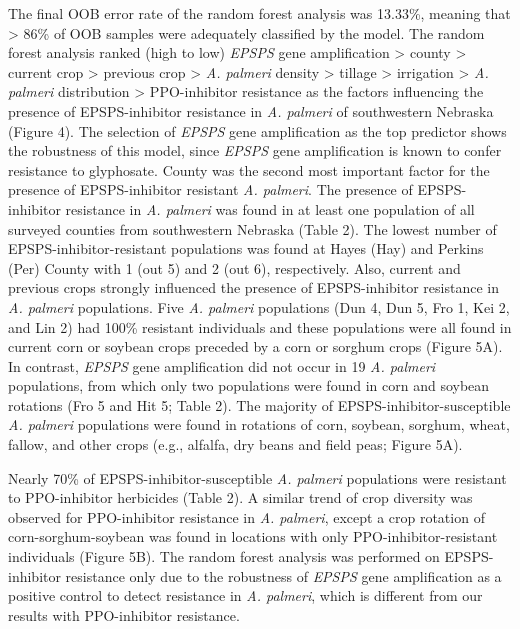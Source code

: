 \documentclass[
  12pt,
  a4paper]{article}
\begin{document}
The final OOB error rate of the random forest analysis was 13.33\%,
meaning that \textgreater{} 86\% of OOB samples were adequately
classified by the model. The random forest analysis ranked (high to low)
\emph{EPSPS} gene amplification \textgreater{} county \textgreater{}
current crop \textgreater{} previous crop \textgreater{} \emph{A.
palmeri} density \textgreater{} tillage \textgreater{} irrigation
\textgreater{} \emph{A. palmeri} distribution \textgreater{}
PPO-inhibitor resistance as the factors influencing the presence of
EPSPS-inhibitor resistance in \emph{A. palmeri} of southwestern Nebraska
(Figure 4). The selection of \emph{EPSPS} gene amplification as the top
predictor shows the robustness of this model, since \emph{EPSPS} gene
amplification is known to confer resistance to glyphosate. County was
the second most important factor for the presence of EPSPS-inhibitor
resistant \emph{A. palmeri}. The presence of EPSPS-inhibitor resistance
in \emph{A. palmeri} was found in at least one population of all
surveyed counties from southwestern Nebraska (Table 2). The lowest
number of EPSPS-inhibitor-resistant populations was found at Hayes (Hay)
and Perkins (Per) County with 1 (out 5) and 2 (out 6), respectively.
Also, current and previous crops strongly influenced the presence of
EPSPS-inhibitor resistance in \emph{A. palmeri} populations. Five
\emph{A. palmeri} populations (Dun 4, Dun 5, Fro 1, Kei 2, and Lin 2)
had 100\% resistant individuals and these populations were all found in
current corn or soybean crops preceded by a corn or sorghum crops
(Figure 5A). In contrast, \emph{EPSPS} gene amplification did not occur
in 19 \emph{A. palmeri} populations, from which only two populations
were found in corn and soybean rotations (Fro 5 and Hit 5; Table 2). The
majority of EPSPS-inhibitor-susceptible \emph{A. palmeri} populations
were found in rotations of corn, soybean, sorghum, wheat, fallow, and
other crops (e.g., alfalfa, dry beans and field peas; Figure 5A).

Nearly 70\% of EPSPS-inhibitor-susceptible \emph{A. palmeri} populations
were resistant to PPO-inhibitor herbicides (Table 2). A similar trend of
crop diversity was observed for PPO-inhibitor resistance in \emph{A.
palmeri}, except a crop rotation of corn-sorghum-soybean was found in
locations with only PPO-inhibitor-resistant individuals (Figure 5B). The
random forest analysis was performed on EPSPS-inhibitor resistance only
due to the robustness of \emph{EPSPS} gene amplification as a positive
control to detect resistance in \emph{A. palmeri}, which is different
from our results with PPO-inhibitor resistance.
\end{document}
